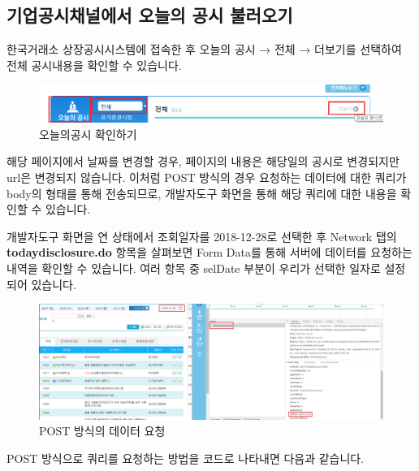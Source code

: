 \documentclass[]{book}
\begin{document}
\hypertarget{section-15}{%
\subsection{기업공시채널에서 오늘의 공시 불러오기}\label{section-15}}

한국거래소 상장공시시스템에 접속한 후 오늘의 공시 → 전체 → 더보기를 선택하여 전체 공시내용을 확인할 수 있습니다.

\begin{figure}

{\centering \includegraphics{images/crawl_kind} 

}

\caption{오늘의공시 확인하기}\label{fig:unnamed-chunk-11}
\end{figure}

해당 페이지에서 날짜를 변경할 경우, 페이지의 내용은 해당일의 공시로 변경되지만 url은 변경되지 않습니다. 이처럼 POST 방식의 경우 요청하는 데이터에 대한 쿼리가 body의 형태를 통해 전송되므로, 개발자도구 화면을 통해 해당 쿼리에 대한 내용을 확인할 수 있습니다.

개발자도구 화면을 연 상태에서 조회일자를 2018-12-28로 선택한 후 Network 탭의 \textbf{todaydisclosure.do} 항목을 살펴보면 Form Data를 통해 서버에 데이터를 요청하는 내역을 확인할 수 있습니다. 여러 항목 중 selDate 부분이 우리가 선택한 일자로 설정되어 있습니다.

\begin{figure}

{\centering \includegraphics[width=1\linewidth]{images/crawl_kind_post} 

}

\caption{POST 방식의 데이터 요청}\label{fig:unnamed-chunk-12}
\end{figure}

POST 방식으로 쿼리를 요청하는 방법을 코드로 나타내면 다음과 같습니다.
\end{document}
